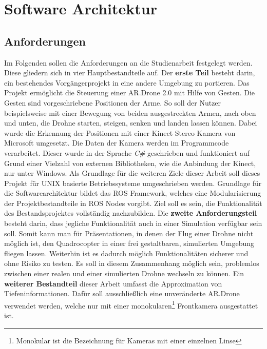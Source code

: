 
\chapter{Software Architektur}
\section{Anforderungen}
\label{sec:Anforderungen} 

Im Folgenden sollen die Anforderungen an die Studienarbeit festgelegt werden. Diese gliedern sich in vier Hauptbestandteile auf. \newline
Der \textbf{erste Teil} besteht darin, ein bestehendes Vorgängerprojekt in eine andere Umgebung zu portieren. Das Projekt ermöglicht die Steuerung einer AR.Drone 2.0 mit Hilfe von Gesten. Die Gesten sind vorgeschriebene Positionen der Arme. So soll der Nutzer beispielsweise mit einer Bewegung von beiden ausgestreckten Armen, nach oben und unten, die Drohne starten, steigen, senken und landen lassen können. \newline
Dabei wurde die Erkennung der Positionen mit einer Kinect Stereo Kamera von Microsoft umgesetzt. Die Daten der Kamera werden im Programmcode verarbeitet. Dieser wurde in der Sprache \textit{C\#} geschrieben und funktioniert auf Grund einer Vielzahl von externen Bibliotheken, wie die Anbindung der Kinect, nur unter Windows. \newline
Als Grundlage für die weiteren Ziele dieser Arbeit soll dieses Projekt für UNIX basierte Betriebssysteme umgeschrieben werden. Grundlage für die Softwarearchitektur bildet das ROS Framework, welches eine Modularisierung der Projektbestandteile in ROS Nodes vorgibt. Ziel soll es sein, die Funktionalität des Bestandsprojektes vollständig nachzubilden. \newline
Die \textbf{zweite Anforderungsteil} besteht darin, dass jegliche Funktionalität auch in einer Simulation verfügbar sein soll. Somit kann man für Präsentationen, in denen der Flug einer Drohne nicht möglich ist, den Quadrocopter in einer frei gestaltbaren, simulierten Umgebung fliegen lassen. Weiterhin ist es dadurch möglich Funktionalitäten sicherer und ohne Risiko zu testen. \newline
Es soll in diesem Zusammenhang möglich sein, problemlos zwischen einer realen und einer simulierten Drohne wechseln zu können.
Ein \textbf{weiterer Bestandteil} dieser Arbeit umfasst die Approximation von Tiefeninformationen. Dafür soll ausschließlich eine unveränderte AR.Drone verwendet werden, welche nur mit einer monokularen\footnote{Monokular ist die Bezeichnung für Kameras mit einer einzelnen Linse} Frontkamera ausgestattet ist. \newline
